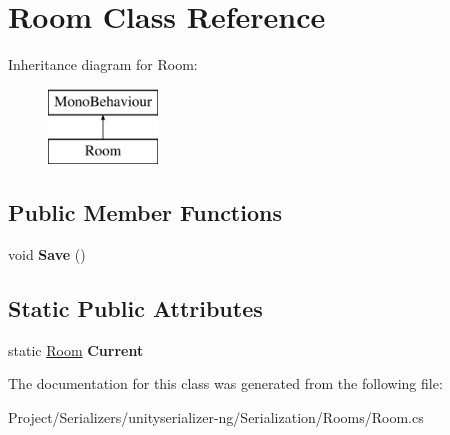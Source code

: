 \hypertarget{class_room}{}\section{Room Class Reference}
\label{class_room}
Inheritance diagram for Room\+:\begin{figure}[H]
\begin{center}
\leavevmode
\includegraphics[height=2.000000cm]{class_room}
\end{center}
\end{figure}
\subsection*{Public Member Functions}
\begin{DoxyCompactItemize}
\item 
\mbox{\label{class_room_a4f68e1dc04721a708c3663cc7e9020c3}} 
void {\bfseries Save} ()
\end{DoxyCompactItemize}
\subsection*{Static Public Attributes}
\begin{DoxyCompactItemize}
\item 
\mbox{\label{class_room_a68d55b64ae2e018accd029731c2ca354}} 
static \hyperlink{class_room}{Room} {\bfseries Current}
\end{DoxyCompactItemize}


The documentation for this class was generated from the following file\+:\begin{DoxyCompactItemize}
\item 
Project/\+Serializers/unityserializer-\/ng/\+Serialization/\+Rooms/Room.\+cs\end{DoxyCompactItemize}
